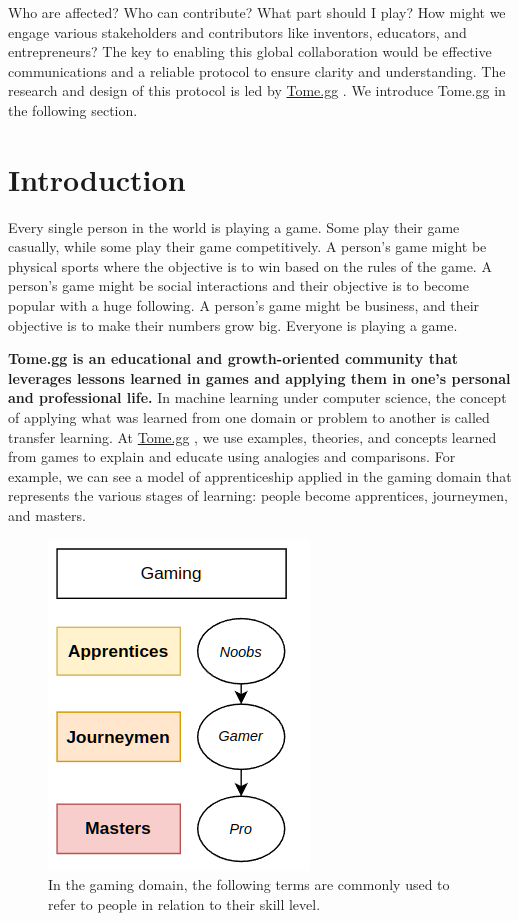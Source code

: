\documentclass[conference]{IEEEtran}
\newcommand{\tomegg}{
  \href{http://tome.gg}{Tome.gg}
}
\begin{document}
Who are affected? Who can contribute? What part should I play? How might we
engage various stakeholders and contributors like inventors, educators, and 
entrepreneurs? 
The key to enabling this global collaboration would be effective communications
and a reliable protocol to ensure clarity and understanding. 
The research and design of this protocol is led by \tomegg. We introduce Tome.gg
in the following section.

\section{Introduction}
\label{sec:introduction}
Every single person in the world is playing a game. Some play their game casually,
while some play their game competitively. A person's game might be physical sports
where the objective is to win based on the rules of the game. A person's game
might be social interactions and their objective is to become popular with a huge 
following. A person's game might be business, and their objective is to make their 
numbers grow big. Everyone is playing a game.

  \textbf{Tome.gg is an educational and growth-oriented community that leverages
  lessons learned in games and applying them in one's personal and professional life.} 
  In machine learning under computer science, the concept of applying what was 
  learned from one domain or problem to another is called transfer learning\cite{b5}.
  At \tomegg, we use examples, theories, and concepts learned from games to explain
  and educate using analogies and comparisons. 
  For example, we can see a model of apprenticeship\cite{b4} applied in the gaming domain
  that represents the various stages of learning: people become apprentices, 
  journeymen, and masters.

\begin{figure}[t]
  \includegraphics[scale=0.7]{stakeholders-gaming}
  \centering
  \caption{In the gaming domain, the following terms are commonly used to refer 
  to people in relation to their skill level.}
  \label{fig:stakeholders-gaming} 
\end{figure}
\end{document}
